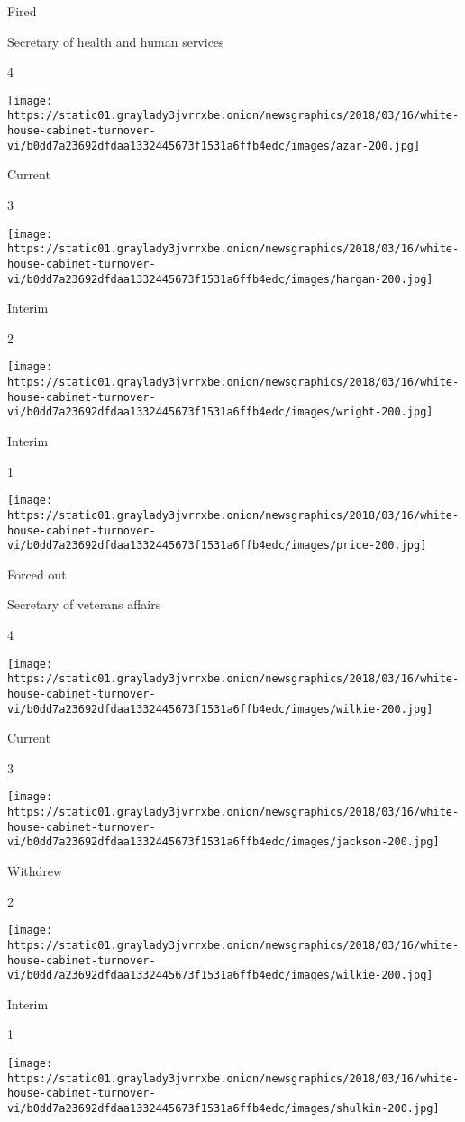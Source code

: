 Fired

Secretary of health and human services

4

\texttt{[image: https://static01.graylady3jvrrxbe.onion/newsgraphics/2018/03/16/white-house-cabinet-turnover-vi/b0dd7a23692dfdaa1332445673f1531a6ffb4edc/images/azar-200.jpg]}

Current

3

\texttt{[image: https://static01.graylady3jvrrxbe.onion/newsgraphics/2018/03/16/white-house-cabinet-turnover-vi/b0dd7a23692dfdaa1332445673f1531a6ffb4edc/images/hargan-200.jpg]}

Interim

2

\texttt{[image: https://static01.graylady3jvrrxbe.onion/newsgraphics/2018/03/16/white-house-cabinet-turnover-vi/b0dd7a23692dfdaa1332445673f1531a6ffb4edc/images/wright-200.jpg]}

Interim

1

\texttt{[image: https://static01.graylady3jvrrxbe.onion/newsgraphics/2018/03/16/white-house-cabinet-turnover-vi/b0dd7a23692dfdaa1332445673f1531a6ffb4edc/images/price-200.jpg]}

Forced out

Secretary of veterans affairs

4

\texttt{[image: https://static01.graylady3jvrrxbe.onion/newsgraphics/2018/03/16/white-house-cabinet-turnover-vi/b0dd7a23692dfdaa1332445673f1531a6ffb4edc/images/wilkie-200.jpg]}

Current

3

\texttt{[image: https://static01.graylady3jvrrxbe.onion/newsgraphics/2018/03/16/white-house-cabinet-turnover-vi/b0dd7a23692dfdaa1332445673f1531a6ffb4edc/images/jackson-200.jpg]}

Withdrew

2

\texttt{[image: https://static01.graylady3jvrrxbe.onion/newsgraphics/2018/03/16/white-house-cabinet-turnover-vi/b0dd7a23692dfdaa1332445673f1531a6ffb4edc/images/wilkie-200.jpg]}

Interim

1

\texttt{[image: https://static01.graylady3jvrrxbe.onion/newsgraphics/2018/03/16/white-house-cabinet-turnover-vi/b0dd7a23692dfdaa1332445673f1531a6ffb4edc/images/shulkin-200.jpg]}

